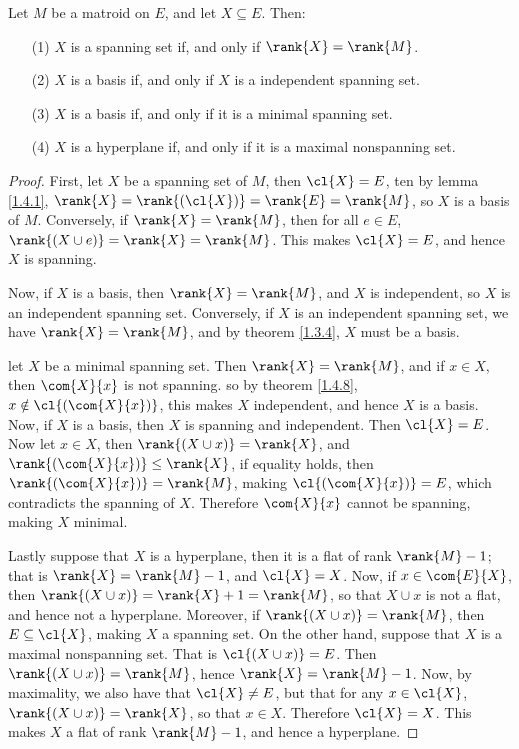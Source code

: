 \begin{theorem}\label{1.4.7}
    Let $M$ be a matroid on  $E$, and let $X \subseteq E$. Then:
    \begin{enumerate}
        \item[(1)] $X$ is a spanning set if, and only if  $\rank{X}=\rank{M}$.

        \item[(2)] $X$ is a basis if, and only if  $X$ is a independent spanning
            set.

        \item[(3)] $X$ is a basis if, and only if it is a minimal spanning set.

        \item[(4)] $X$ is a hyperplane if, and only if it is a maximal
            nonspanning set.
    \end{enumerate}
\end{theorem}
\begin{proof}
    First, let $X$ be a spanning set of $M$, then $\cl{X}=E$, ten by lemma
    \ref{1.4.1}, $\rank{X}=\rank{(\cl{X})}=\rank{E}=\rank{M}$, so $X$ is a basis
    of  $M$. Conversely, if $\rank{X}=\rank{M}$, then for all $e \in E$,
    $\rank{(X \cup e)}=\rank{X}=\rank{M}$. This makes $\cl{X}=E$, and hence $X$
    is spanning.

    Now, if  $X$ is a basis, then  $\rank{X}=\rank{M}$, and $X$ is independent,
    so  $X$ is an independent spanning set. Conversely, if  $X$ is an
    independent spanning set, we have  $\rank{X}=\rank{M}$, and by theorem
    \ref{1.3.4}, $X$ must be a basis.

     let $X$ be a minimal spanning set. Then  $\rank{X}=\rank{M}$, and if $x \in
     X$, then  $\com{X}{x}$ is not spanning. so by theorem \ref{1.4.8}, $x
     \notin \cl{(\com{X}{x})}$, this makes $X$ independent, and hence  $X$ is a
     basis. Now, if  $X$ is a basis, then  $X$ is spanning and independent. Then
      $\cl{X}=E$. Now let $x \in X$, then  $\rank{(X \cup x)}=\rank{X}$, and
      $\rank{(\com{X}{x})} \leq \rank{X}$, if equality holds, then
      $\rank{(\com{X}{x})}=\rank{M}$, making $\cl{(\com{X}{x})}=E$, which
      contradicts the spanning of $X$. Therefore $\com{X}{x}$ cannot be
      spanning, making $X$ minimal.

      Lastly suppose that $X$ is a hyperplane, then it is a flat of rank
      $\rank{M}-1$; that is $\rank{X}=\rank{M}-1$, and $\cl{X}=X$. Now, if $x
      \in \com{E}{X}$, then $\rank{(X \cup x)}=\rank{X}+1=\rank{M}$, so that $X
      \cup x$ is not a flat, and hence not a hyperplane. Moreover, if $\rank{(X
      \cup x)}=\rank{M}$, then $E \subseteq \cl{X}$, making $X$ a spanning set.
      On the other hand, suppose that $X$ is a maximal nonspanning set. That is
      $\cl{(X \cup x)}=E$. Then $\rank{(X \cup x)}=\rank{M}$, hence $\rank{X}=
      \rank{M}-1$. Now, by maximality, we also have that $\cl{X} \neq E$, but
      that for any $x \in \cl{X}$, $\rank{(X \cup x)}=\rank{X}$, so that $x \in
      X$. Therefore  $\cl{X}=X$. This makes $X$ a flat of rank  $\rank{M}-1$,
      and hence a hyperplane.
\end{proof}

